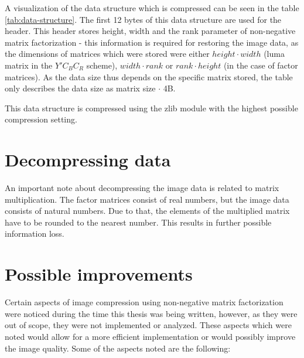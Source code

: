 \documentclass[thesis=M,english]{FITthesis}[2012/10/20]
\begin{document}
A visualization of the data structure which is compressed can be seen in the
table \ref{tab:data-structure}. The first 12 bytes of this data structure
are used for the header. This header stores height, width and the rank parameter
of non-negative matrix factorization - this information is required for restoring
the image data, as the dimensions of matrices which were stored were either
$height \cdot width$ (luma matrix in the $Y'C_BC_R$ scheme), $width \cdot rank$
or $rank \cdot height$ (in the case of factor matrices). As the data size thus
depends on the specific matrix stored, the table only describes the data size
as matrix size $\cdot$ 4B.

This data structure is compressed using the zlib module with the highest possible
compression setting.


\section{Decompressing data}
An important note about decompressing the image data is related to matrix multiplication.
The factor matrices consist of real numbers, but the image data consists of natural numbers.
Due to that, the elements of the multiplied matrix have to be rounded to the nearest number.
This results in further possible information loss.


\section{Possible improvements}
Certain aspects of image compression using non-negative matrix factorization
were noticed during the time this thesis was being written, however, as
they were out of scope, they were not implemented or analyzed. These
aspects which were noted would allow for a more efficient implementation
or would possibly improve the image quality. Some of the aspects
noted are the following:
\end{document}
